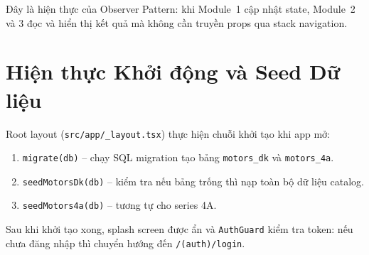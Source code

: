 Đây là hiện thực của Observer Pattern:
khi Module~1 cập nhật state, Module~2 và 3 đọc và hiển thị kết quả
mà không cần truyền props qua stack navigation.

\section{Hiện thực Khởi động và Seed Dữ liệu}
\label{sec:impl-startup}

Root layout (\texttt{src/app/\_layout.tsx}) thực hiện chuỗi khởi tạo khi app mở:

\begin{enumerate}
  \item \texttt{migrate(db)} -- chạy SQL migration tạo bảng \texttt{motors\_dk} và \texttt{motors\_4a}.
  \item \texttt{seedMotorsDk(db)} -- kiểm tra nếu bảng trống thì nạp toàn bộ dữ liệu catalog.
  \item \texttt{seedMotors4a(db)} -- tương tự cho series 4A.
\end{enumerate}

Sau khi khởi tạo xong, splash screen được ẩn và \texttt{AuthGuard} kiểm tra token:
nếu chưa đăng nhập thì chuyển hướng đến \texttt{/(auth)/login}.
